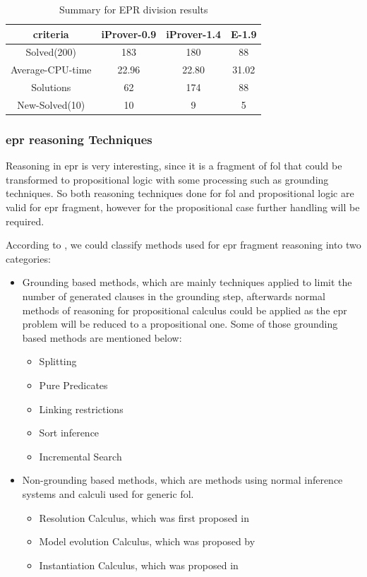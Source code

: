 \begin{table}[H]
	\centering
	\begin{tabular}{||c | c | c | c||} 
 		\hline
		criteria & iProver-0.9 & iProver-1.4 & E-1.9 \\ %
 		\hline\hline
		Solved(200) & 183 & 180 & 88 \\
		Average-CPU-time & 22.96 & 22.80 & 31.02 \\
		Solutions & 62 & 174 & 88 \\
		New-Solved(10) & 10 & 9 & 5 \\ [1ex] 
 		\hline
		\end{tabular}
	\caption{Summary for EPR division results}
	\label{table:epr_casc_results}
\end{table}




\subsubsection{\ac{epr} reasoning Techniques}
Reasoning in \ac{epr} is very interesting, since it is a fragment of \ac{fol} that could be transformed to propositional logic with some processing such as grounding techniques. So both reasoning techniques done for \ac{fol} and propositional logic are valid for \ac{epr} fragment, however for the propositional case further handling will be required.


According to \cite{EPR_PHD}, we could classify methods used for \ac{epr} fragment reasoning into two categories:
	\begin{itemize}
		\item Grounding based methods, which are mainly techniques applied to limit the number of generated clauses in the grounding step, afterwards normal methods of reasoning for propositional calculus could be applied as the \ac{epr} problem will be reduced to a propositional one. Some of those grounding based methods are mentioned below: 
			\begin{itemize}
				\item Splitting
				\item Pure Predicates
				\item Linking restrictions
				\item Sort inference
				\item Incremental Search			
			\end{itemize}
		\item Non-grounding based methods, which are methods using normal inference systems and calculi used for generic \ac{fol}.
			\begin{itemize}
				\item Resolution Calculus, which was first proposed in \cite{RES_65}
				\item Model evolution Calculus, which was proposed by \cite{MOD03}  
				\item Instantiation Calculus, which was proposed in \cite{INST03}
			\end{itemize} 
	\end{itemize}		

